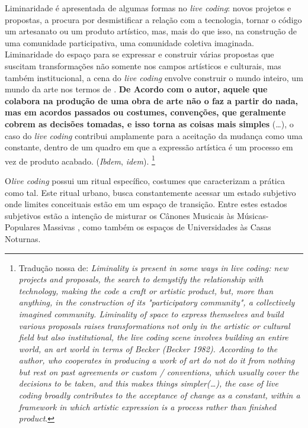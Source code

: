 \begin{citacao}
Liminaridade é apresentada de algumas formas no \emph{live coding}: novos projetos e propostas, a procura por desmistificar a relação com a tecnologia, tornar o código um artesanato ou um produto artístico, mas, mais do que isso, na construção de uma comunidade participativa, uma comunidade coletiva imaginada. Liminaridade do espaço para se expressar e construir várias propostas que suscitam transformações não somente nos campos artísticos e culturais, mas também institucional, a cena do \emph{live coding} envolve construir o mundo inteiro, um mundo da arte nos termos de . \textbf{De Acordo com o autor, aquele que colabora na produção de uma obra de arte não o faz a partir do nada, mas em acordos passados ou costumes, convenções, que geralmente cobrem as decisões tomadas, e isso torna as coisas mais simples} (\ldots), o caso do \emph{live coding} contribui amplamente para a aceitação da mudança como uma constante, dentro de um quadro em que a expressão artística é um processo em vez de produto acabado. (\emph{Ibdem}, \emph{idem}). \footnote{Tradução nossa de: \emph{Liminality is present in some ways in live coding: new projects and proposals, the search to demystify the relationship with technology, making the code a craft or artistic product, but, more than anything, in the construction of its "participatory community", a collectively imagined community. Liminality of space to express themselves and build various proposals raises transformations not only in the artistic or cultural field but also institutional, the live coding scene involves building an entire world, an art world in terms of Becker (Becker 1982). According to the author, who cooperates in producing a work of art do not do it from nothing but rest on past agreements or custom / conventions, which usually cover the decisions to be taken, and this makes things simpler(\ldots),  the case of live coding broadly contributes to the acceptance of change as a constant, within a framework in which artistic expression is a process rather than finished product}.}
\end{citacao}

O\emph{live coding} possui um ritual específico, costumes que caracterizam a prática como tal. Este ritual urbano, busca constantemente acessar um estado subjetivo onde limites conceituais estão em um espaço de transição. Entre estes estados subjetivos estão a intenção de misturar os Cânones Musicais às Músicas-Populares Massivas \cite{sa_se_2009}, como também os espaços de Universidades às Casas Noturnas.

